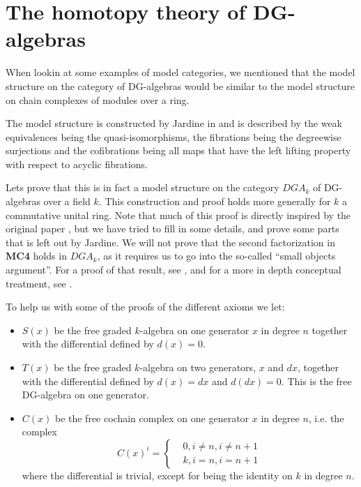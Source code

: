 

\section{The homotopy theory of DG-algebras}

When lookin at some examples of model categories, we mentioned that the model structure on the category of DG-algebras would be similar to the model structure on chain complexes of modules over a ring. 

The model structure is constructed by Jardine in \cite{jardine} and is described by the weak equivalences being the quasi-isomorphisms, the fibrations being the degreewise surjections and the cofibrations being all maps that have the left lifting property with respect to acyclic fibrations. 

Lets prove that this is in fact a model structure on the category $DGA_k$ of DG-algebras over a field $k$. This construction and proof holds more generally for $k$ a commutative unital ring. Note that much of this proof is directly inspired by the  original paper \cite{jardine}, but we have tried to fill in some details, and prove some parts that is left out by Jardine. We will not prove that the second factorization in \textbf{MC4} holds in $DGA_k$, as it requires us to go into the so-called ``small objects argument''. For a proof of that result, see \cite[Theorem 2.1.14]{hovey}, and for a more in depth conceptual treatment, see \cite{small_objects}.

To help us with some of the proofs of the different axioms we let:
\begin{itemize}
	\item $S(x)$ be the free graded $k$-algebra on one generator $x$ in degree $n$ together with the differential defined by $d(x)=0$.
	
	\item $T(x)$ be the free graded $k$-algebra on two generators, $x$ and $dx$, together with the differential defined by $d(x)=dx$ and $d(dx)=0$. This is the free DG-algebra on one generator.
	\item $C(x)$ be the free cochain complex on one generator $x$ in degree $n$, i.e. the complex 
\begin{equation*}
    C(x)^i = 
    \begin{cases}
        &  0, i\neq n, i\neq n+1 \\
        & k, i = n, i= n+1
    \end{cases}
\end{equation*}
where the differential is trivial, except for being the identity on $k$ in degree $n$. 
\end{itemize}



